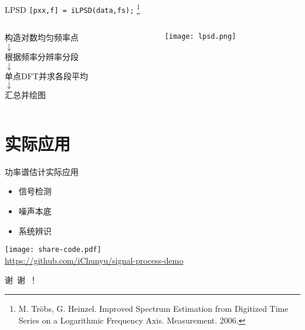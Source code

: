 \documentclass{beamer}
\begin{document}
\begin{frame}{LPSD}
    \small
    \texttt{[pxx,f] = iLPSD(data,fs);}
    \footnote{M. Tröbs, G. Heinzel. Improved Spectrum Estimation from Digitized Time Series on a Logarithmic Frequency Axis. Measurement. 2006.
    }
    \vspace{\fill}
    \begin{columns}
        \begin{column}{0.4\textwidth}
            \centering
            构造对数均匀频率点 \\
            $\downarrow$ \\
            根据频率分辨率分段 \\
            $\downarrow$ \\
            单点DFT并求各段平均 \\
            $\downarrow$ \\
            汇总并绘图
        \end{column}
        \begin{column}{0.6\textwidth}
            \centering
            \texttt{[image: lpsd.png]}
        \end{column}
    \end{columns}
\end{frame}


\section{实际应用}
\begin{frame}{功率谱估计实际应用}
    \begin{itemize}
        \item 信号检测
        \item 噪声本底
        \item 系统辨识
    \end{itemize}
    
    \hfill\texttt{[image: share-code.pdf]} \\
    \hfill\href{https://github.com/iChunyu/signal-process-demo}{\scriptsize https://github.com/iChunyu/signal-process-demo}
    
\end{frame}

\begin{frame}[standout]
     谢\ 谢\ ！
\end{frame}
\end{document}
